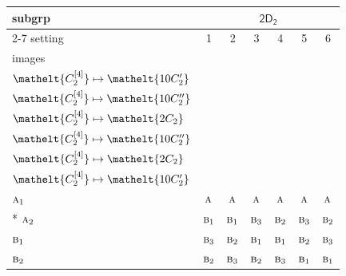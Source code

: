 \documentclass[10pt,a4paper]{article}
\numberwithin{equation}{section}
\newcommand{\eltfont}[1]{{\let\sigma\eltsigma\mathelt{#1}}}
\newcommand{\grp}[1]{\mathsf{#1}}
\newcommand{\irr}[1]{\text{\normalfont\scshape #1}}
\newcommand{\cls}[1]{\eltfont{#1}}
\newcommand{\genidx}[2]{#1^{[\mathrm{#2}]}}
\begin{document}
{\small\begin{longtable}{@{}lcccccc@{}}\toprule
subgrp & \multicolumn{6}{c}{\href{2D2.pdf}{$\grp{2D_{2}}$}}\\\cmidrule(lr){2-7}
setting & 1 & 2 & 3 & 4 & 5 & 6\\
images & {\scriptsize\begin{tabular}[t]{@{}c@{}}$\cls{\genidx{C_{2}}{2}} \mapsto \cls{2C_{2}}$\\$\cls{\genidx{C_{2}}{4}} \mapsto \cls{10C_{2}'}$\end{tabular}} & {\scriptsize\begin{tabular}[t]{@{}c@{}}$\cls{\genidx{C_{2}}{2}} \mapsto \cls{2C_{2}}$\\$\cls{\genidx{C_{2}}{4}} \mapsto \cls{10C_{2}''}$\end{tabular}} & {\scriptsize\begin{tabular}[t]{@{}c@{}}$\cls{\genidx{C_{2}}{2}} \mapsto \cls{10C_{2}'}$\\$\cls{\genidx{C_{2}}{4}} \mapsto \cls{2C_{2}}$\end{tabular}} & {\scriptsize\begin{tabular}[t]{@{}c@{}}$\cls{\genidx{C_{2}}{2}} \mapsto \cls{10C_{2}'}$\\$\cls{\genidx{C_{2}}{4}} \mapsto \cls{10C_{2}''}$\end{tabular}} & {\scriptsize\begin{tabular}[t]{@{}c@{}}$\cls{\genidx{C_{2}}{2}} \mapsto \cls{10C_{2}''}$\\$\cls{\genidx{C_{2}}{4}} \mapsto \cls{2C_{2}}$\end{tabular}} & {\scriptsize\begin{tabular}[t]{@{}c@{}}$\cls{\genidx{C_{2}}{2}} \mapsto \cls{10C_{2}''}$\\$\cls{\genidx{C_{2}}{4}} \mapsto \cls{10C_{2}'}$\end{tabular}}\\\midrule\endhead
\bottomrule\endfoot\endlastfoot
$\irr{a}_{1}$ & $\irr{a}$ & $\irr{a}$ & $\irr{a}$ & $\irr{a}$ & $\irr{a}$ & $\irr{a}$\\*
$\irr{a}_{2}$ & $\irr{b}_{1}$ & $\irr{b}_{1}$ & $\irr{b}_{3}$ & $\irr{b}_{2}$ & $\irr{b}_{3}$ & $\irr{b}_{2}$\\
$\irr{b}_{1}$ & $\irr{b}_{3}$ & $\irr{b}_{2}$ & $\irr{b}_{1}$ & $\irr{b}_{1}$ & $\irr{b}_{2}$ & $\irr{b}_{3}$\\
$\irr{b}_{2}$ & $\irr{b}_{2}$ & $\irr{b}_{3}$ & $\irr{b}_{2}$ & $\irr{b}_{3}$ & $\irr{b}_{1}$ & $\irr{b}_{1}$\\

\end{longtable}}
\end{document}
